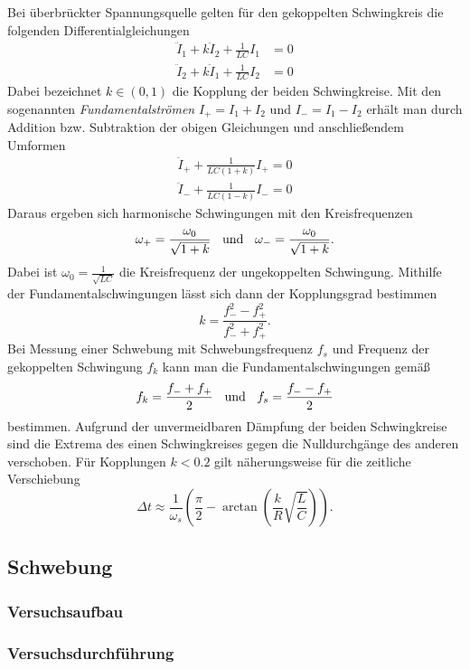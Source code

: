 Bei überbrückter Spannungsquelle gelten für den gekoppelten Schwingkreis die folgenden Differentialgleichungen 
\begin{align*}
\ddot I_1 + k \ddot I_2 + \frac{1}{LC}I_1 &= 0 \\
\ddot I_2 + k \ddot I_1 + \frac{1}{LC}I_2 &= 0
\end{align*}
Dabei bezeichnet $k \in (0,1)$ die Kopplung der beiden Schwingkreise. 
Mit den sogenannten \textit{Fundamentalströmen} $I_+ = I_1 + I_2$ und $I_- = I_1 - I_2$ erhält man durch Addition bzw. Subtraktion der obigen Gleichungen und anschließendem Umformen
\begin{align*}
\ddot I_+ + \frac{1}{LC(1+k)} I_+ = 0 \\
\ddot I_- + \frac{1}{LC(1-k)} I_- = 0
\end{align*}
Daraus ergeben sich harmonische Schwingungen mit den Kreisfrequenzen 
$$\omega_+ = \frac{\omega_0}{\sqrt{1+k}} \hspace{0.2cm} \text{ und } \hspace{0.2cm} \omega_- = \frac{\omega_0}{\sqrt{1+k}}.$$
Dabei ist $\omega_0 = \frac{1}{\sqrt{LC}}$ die Kreisfrequenz der ungekoppelten Schwingung. Mithilfe der Fundamentalschwingungen lässt sich dann der Kopplungsgrad bestimmen
$$k = \frac{f_-^2 - f_+^2}{f_-^2 + f_+^2}.$$
Bei Messung einer Schwebung mit Schwebungsfrequenz $f_s$ und Frequenz der gekoppelten Schwingung $f_k$ kann man die Fundamentalschwingungen gemäß
$$f_k = \frac{f_- + f_+}{2} \hspace{0.2cm} \text{ und } \hspace{0.2cm} f_s = \frac{f_- - f_+}{2}$$
bestimmen. Aufgrund der unvermeidbaren Dämpfung der beiden Schwingkreise sind die Extrema des einen Schwingkreises gegen die Nulldurchgänge des anderen verschoben. Für Kopplungen $k < 0.2$ gilt näherungsweise für die zeitliche Verschiebung
$$\Delta t \approx \frac{1}{\omega_s} \left( \frac{\pi}{2} - \arctan\left(  \frac kR \sqrt{\frac LC}\right) \right).$$

\subsection{Schwebung}

\subsubsection{Versuchsaufbau}

\subsubsection{Versuchsdurchführung}


